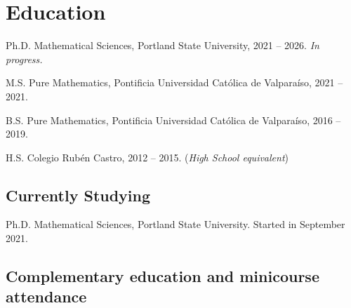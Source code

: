\documentclass[12pt,letterpaper]{report}
\begin{document}

    
    \section*{Education}

    \begin{tablist}
        \item[Ph.D.] \tab Mathematical Sciences, Portland State University, 2021 -- 2026. \emph{In progress.}
        \item[M.S.]  \tab Pure Mathematics, Pontificia Universidad Cat\'olica de Valpara\'iso, 2021 -- 2021.
        \item[B.S.]  \tab Pure Mathematics, Pontificia Universidad Cat\'olica de Valpara\'iso, 2016 -- 2019.
        \item[H.S.] \tab Colegio Rub\'en Castro, 2012 -- 2015. (\emph{High School equivalent})
    \end{tablist}

    \subsection*{Currently Studying}

    \begin{tablist}
        
        \item[Ph.D.] \tab Mathematical Sciences, Portland State University. Started in September 2021.
    \end{tablist}

    \subsection*{Complementary education and minicourse attendance}
\end{document}
